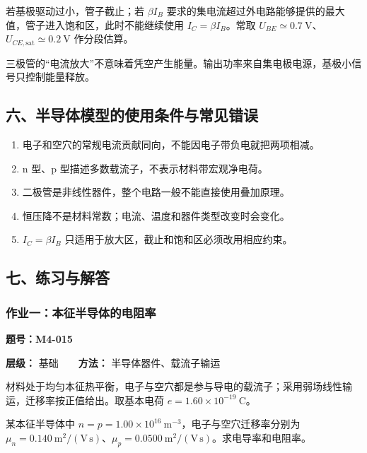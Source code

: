 若基极驱动过小，管子截止；若 \(\beta I_B\)
要求的集电流超过外电路能够提供的最大值，管子进入饱和区，此时不能继续使用
\(I_C=\beta I_B\)。常取
\(U_{BE}\simeq0.7\ \mathrm V\)、\(U_{CE,\mathrm{sat}}\simeq0.2\ \mathrm V\)
作分段估算。

三极管的``电流放大''不意味着凭空产生能量。输出功率来自集电极电源，基极小信号只控制能量释放。

\subsection{六、半导体模型的使用条件与常见错误}\label{m4:ux516dux534aux5bfcux4f53ux6a21ux578bux7684ux4f7fux7528ux6761ux4ef6ux4e0eux5e38ux89c1ux9519ux8bef}

\begin{enumerate}
\def\labelenumi{\arabic{enumi}.}
\tightlist
\item
  电子和空穴的常规电流贡献同向，不能因电子带负电就把两项相减。
\item
  n 型、p 型描述多数载流子，不表示材料带宏观净电荷。
\item
  二极管是非线性器件，整个电路一般不能直接使用叠加原理。
\item
  恒压降不是材料常数；电流、温度和器件类型改变时会变化。
\item
  \(I_C=\beta I_B\) 只适用于放大区，截止和饱和区必须改用相应约束。
\end{enumerate}

\subsection{七、练习与解答}\label{m4:ux4e03ux7ec3ux4e60ux4e0eux89e3ux7b54-1}

\par{}
\noindent\begin{minipage}{\linewidth}

\subsubsection{作业一：本征半导体的电阻率}\label{m4:ux4f5cux4e1aux4e00ux672cux5f81ux534aux5bfcux4f53ux7684ux7535ux963bux7387}

\textbf{题号：M4-015}

\textbf{层级：} 基础　　\textbf{方法：} 半导体器件、载流子输运

材料处于均匀本征热平衡，电子与空穴都是参与导电的载流子；采用弱场线性输运，迁移率按正值给出。取基本电荷
\(e=1.60\times10^{-19}\ \mathrm C\)。

某本征半导体中
\(n=p=1.00\times10^{16}\ \mathrm{m^{-3}}\)，电子与空穴迁移率分别为
\(\mu_n=0.140\ \mathrm{m^2/(V\,s)}\)、\(\mu_p=0.0500\ \mathrm{m^2/(V\,s)}\)。求电导率和电阻率。

\end{minipage}\par

